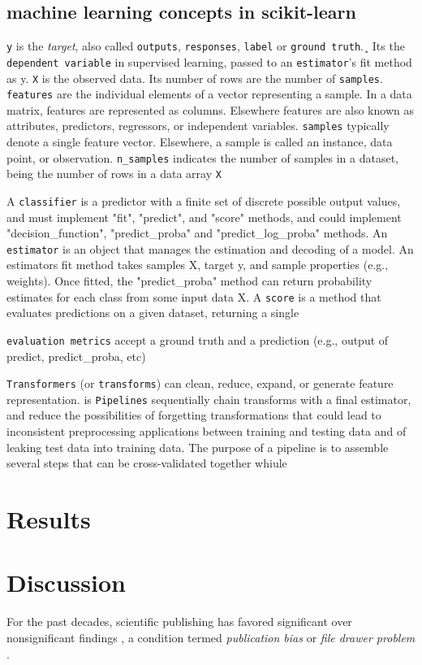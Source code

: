 \subsection{machine learning concepts in scikit-learn}

\texttt{y} is the \textit{target}, also called \texttt{outputs}, \texttt{responses}, \texttt{label} or \texttt{ground truth}.¸ Its the \texttt{dependent variable} in supervised learning, passed to an \texttt{estimator}'s fit method as y.
\texttt{X} is the observed data. Its number of rows are the number of \texttt{samples}.
\texttt{features} are the individual elements of a vector representing a sample. In a data matrix, features are represented as columns. Elsewhere features are also known as attributes, predictors, regressors, or independent variables.
\texttt{samples} typically denote a single feature vector. Elsewhere, a sample is called an instance, data point, or observation. \texttt{n\_samples} indicates the number of samples in a dataset, being the number of rows in a data array \texttt{X}


A \texttt{classifier} is a predictor with a finite set of discrete possible output values, and must implement "fit", "predict", and "score" methods, and could implement "decision\_function", "predict\_proba" and "predict\_log\_proba" methods.
An \texttt{estimator} is an object that manages the estimation and decoding of a model. An estimators fit method takes samples X, target y, and sample properties (e.g., weights). Once fitted, the "predict\_proba" method can return probability estimates for each class from some input data X. A \texttt{score} is a method that evaluates predictions on a given dataset, returning a single

\texttt{evaluation metrics} accept a ground truth and a prediction (e.g., output of predict, predict\_proba, etc)

\texttt{Transformers} (or \texttt{transforms}) can clean, reduce, expand, or generate feature representation.
 is
\texttt{Pipelines} sequentially chain transforms with a final estimator, and reduce the possibilities of forgetting transformations that could lead to inconsistent preprocessing applications between training and testing data and of leaking test data into training data. The purpose of a pipeline is to assemble several steps that can be cross-validated together whiule

\section{Results}
\pagebreak

\section{Discussion}
For the past decades, scientific publishing has favored significant over nonsignificant findings \citep{dwan2008systematic}, a condition termed \textit{publication bias} or \textit{file drawer problem} \citep{rosenthal1979file}.

